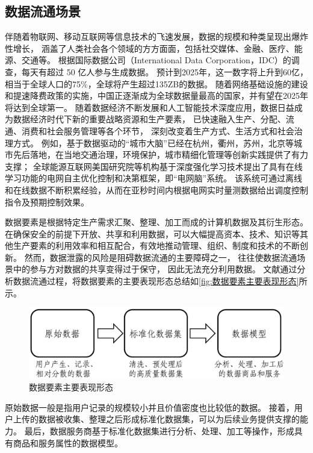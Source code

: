 \subsection{数据流通场景}
伴随着物联网、移动互联网等信息技术的飞速发展，数据的规模和种类呈现出爆炸性增长，
涵盖了人类社会各个领域的方方面面，包括社交媒体、金融、医疗、能源、交通等。
根据国际数据公司（International Data Corporation，IDC）的调查，每天有超过 50 亿人参与生成数据。
预计到2025年，这一数字将上升到60亿，相当于全球人口的75\%，全球将产生超过135ZB的数据。
随着网络基础设施的建设和提速降费政策的实施，中国正逐渐成为全球数据量最高的国家，并有望在2025年将达到全球第一\cite{IDC2018-1}。
随着数据经济不断发展和人工智能技术深度应用，数据日益成为数据经济时代下新的重要战略资源和生产要素，
已快速融入生产、分配、流通、消费和社会服务管理等各个环节，
深刻改变着生产方式、生活方式和社会治理方式\cite{庄子银2022充分发挥数据新型生产要素作用}。
例如，基于数据驱动的“城市大脑”已经在杭州，衢州，苏州，北京等城市先后落地，在当地交通治理，环境保护，城市精细化管理等创新实践提供了有力支撑\cite{叶晓楠2019}；
全球能源互联网美国研究院等机构基于深度强化学习技术提出了具有在线学习功能的电网自主优化控制和决第框架，即“电网脑”系统。
该系统可通过离线和在线数据不断积累经验，从而在亚秒时间内根据电网实时量测数据给出调度控制指令及预期控制效果\cite{王之伟2020基于深度强化学习的电网自主控制与决策技术}。

数据要素是根据特定生产需求汇聚、整理、加工而成的计算机数据及其衍生形态\cite{信通院2023数据要素白皮书}。
在确保安全的前提下开放、共享和利用数据，可以大幅提高资本、技术、知识等其他生产要素的利用效率和相互配合，有效地推动管理、组织、制度和技术的不断创新。
然而，数据泄露的风险是阻碍数据流通的主要障碍之一，
往往使数据流通场景中的参与方对数据的共享变得过于保守，
因此无法充分利用数据\cite{陈晓建2019大数据安全流通机制的研究与应用}。
文献{\rm\parencite{信通院2023数据要素白皮书}}通过分析数据流通过程，将数据要素的主要表现形态总结如\autoref{fig:数据要素主要表现形态}所示。
\begin{figure}[h]
    \centering
    \includegraphics[width=0.70\hsize]{figure/others/数据要素主要表现形态.pdf}
    \caption{数据要素主要表现形态} 
    \label{fig:数据要素主要表现形态}
\end{figure}
原始数据一般是指用户记录的规模较小并且价值密度也比较低的数据。
接着，用户上传的数据被收集、整理之后形成标准化数据集，可以为后续业务提供支撑的能力。
最后，数据服务商基于标准化数据集进行分析、处理、加工等操作，形成具有商品和服务属性的数据模型。

